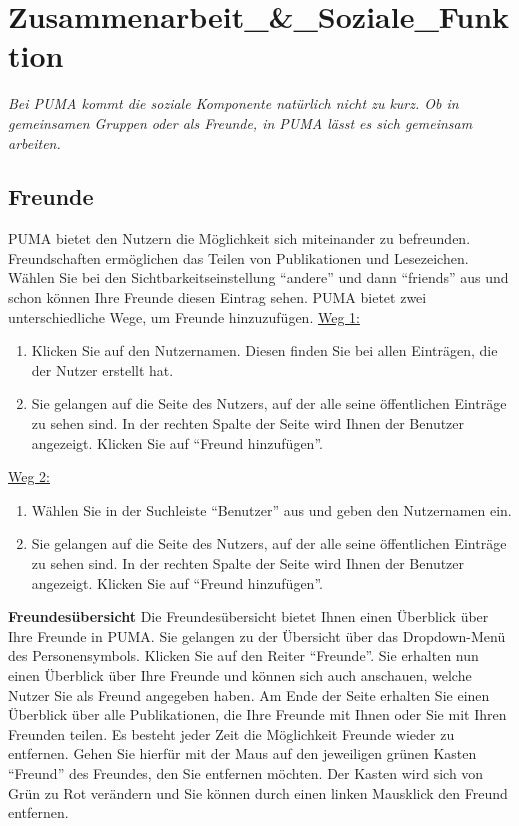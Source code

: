 \section{Zusammenarbeit_&_Soziale_Funktion}
\textit{Bei PUMA kommt die soziale Komponente natürlich nicht zu kurz. Ob in gemeinsamen Gruppen oder als Freunde, in PUMA lässt es sich gemeinsam arbeiten.}
\subsection{Freunde}%
PUMA bietet den Nutzern die Möglichkeit sich miteinander zu befreunden. Freundschaften ermöglichen das Teilen von Publikationen und Lesezeichen. Wählen Sie bei den Sichtbarkeitseinstellung \enquote{andere} und dann \enquote{friends} aus und schon können Ihre Freunde diesen Eintrag sehen.
PUMA bietet zwei unterschiedliche Wege, um Freunde hinzuzufügen.
\newline
\newline
\underline{Weg 1:}
\begin{enumerate}
    \item Klicken Sie auf den Nutzernamen. Diesen finden Sie bei allen Einträgen, die der Nutzer erstellt hat.
    \item Sie gelangen auf die Seite des Nutzers, auf der alle seine öffentlichen Einträge zu sehen sind. In der rechten Spalte der Seite wird Ihnen der Benutzer angezeigt. Klicken Sie auf \enquote{Freund hinzufügen}.
\end{enumerate}
\underline{Weg 2:}
\begin{enumerate}
    \item Wählen Sie in der Suchleiste \enquote{Benutzer} aus und geben den Nutzernamen ein.
    \item Sie gelangen auf die Seite des Nutzers, auf der alle seine öffentlichen Einträge zu sehen sind. In der rechten Spalte der Seite wird Ihnen der Benutzer angezeigt. Klicken Sie auf \enquote{Freund hinzufügen}.
\end{enumerate}
\textbf{Freundesübersicht} \newline
Die Freundesübersicht bietet Ihnen einen Überblick über Ihre Freunde in PUMA. Sie gelangen zu der Übersicht über das Dropdown-Menü des Personensymbols. Klicken Sie auf den Reiter \enquote{Freunde}. Sie erhalten nun einen Überblick über Ihre Freunde und können sich auch anschauen, welche Nutzer Sie als Freund angegeben haben. Am Ende der Seite erhalten Sie einen Überblick über alle Publikationen, die Ihre Freunde mit Ihnen oder Sie mit Ihren Freunden teilen.\newline
Es besteht jeder Zeit die Möglichkeit Freunde wieder zu entfernen. Gehen Sie hierfür mit der Maus auf den jeweiligen grünen Kasten \enquote{Freund} des Freundes, den Sie entfernen möchten. Der Kasten wird sich von Grün zu Rot verändern und Sie können durch einen linken Mausklick den Freund entfernen. 
